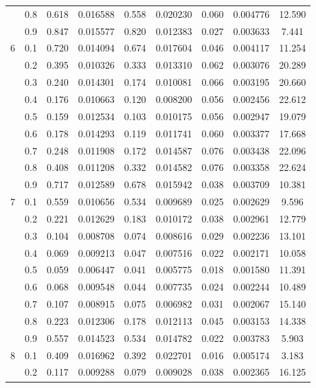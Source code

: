 \begin{longtable}{ | c | c || c | c | c | c | c | c | c | }
 & 0.8 & 0.618 & 0.016588 & 0.558 & 0.020230 & 0.060 & 0.004776 & 12.590 \\
 & 0.9 & 0.847 & 0.015577 & 0.820 & 0.012383 & 0.027 & 0.003633 & 7.441 \\
 \hline
\multirow{9}{*}{6} & 0.1 & 0.720 & 0.014094 & 0.674 & 0.017604 & 0.046 & 0.004117 & 11.254 \\
 & 0.2 & 0.395 & 0.010326 & 0.333 & 0.013310 & 0.062 & 0.003076 & 20.289 \\
 & 0.3 & 0.240 & 0.014301 & 0.174 & 0.010081 & 0.066 & 0.003195 & 20.660 \\
 & 0.4 & 0.176 & 0.010663 & 0.120 & 0.008200 & 0.056 & 0.002456 & 22.612 \\
 & 0.5 & 0.159 & 0.012534 & 0.103 & 0.010175 & 0.056 & 0.002947 & 19.079 \\
 & 0.6 & 0.178 & 0.014293 & 0.119 & 0.011741 & 0.060 & 0.003377 & 17.668 \\
 & 0.7 & 0.248 & 0.011908 & 0.172 & 0.014587 & 0.076 & 0.003438 & 22.096 \\
 & 0.8 & 0.408 & 0.011208 & 0.332 & 0.014582 & 0.076 & 0.003358 & 22.624 \\
 & 0.9 & 0.717 & 0.012589 & 0.678 & 0.015942 & 0.038 & 0.003709 & 10.381 \\
 \hline
\multirow{9}{*}{7} & 0.1 & 0.559 & 0.010656 & 0.534 & 0.009689 & 0.025 & 0.002629 & 9.596 \\
 & 0.2 & 0.221 & 0.012629 & 0.183 & 0.010172 & 0.038 & 0.002961 & 12.779 \\
 & 0.3 & 0.104 & 0.008708 & 0.074 & 0.008616 & 0.029 & 0.002236 & 13.101 \\
 & 0.4 & 0.069 & 0.009213 & 0.047 & 0.007516 & 0.022 & 0.002171 & 10.058 \\
 & 0.5 & 0.059 & 0.006447 & 0.041 & 0.005775 & 0.018 & 0.001580 & 11.391 \\
 & 0.6 & 0.068 & 0.009548 & 0.044 & 0.007735 & 0.024 & 0.002244 & 10.489 \\
 & 0.7 & 0.107 & 0.008915 & 0.075 & 0.006982 & 0.031 & 0.002067 & 15.140 \\
 & 0.8 & 0.223 & 0.012306 & 0.178 & 0.012113 & 0.045 & 0.003153 & 14.338 \\
 & 0.9 & 0.557 & 0.014523 & 0.534 & 0.014782 & 0.022 & 0.003783 & 5.903 \\
 \hline
\multirow{9}{*}{8} & 0.1 & 0.409 & 0.016962 & 0.392 & 0.022701 & 0.016 & 0.005174 & 3.183 \\
 & 0.2 & 0.117 & 0.009288 & 0.079 & 0.009028 & 0.038 & 0.002365 & 16.125 \\

\end{longtable}

